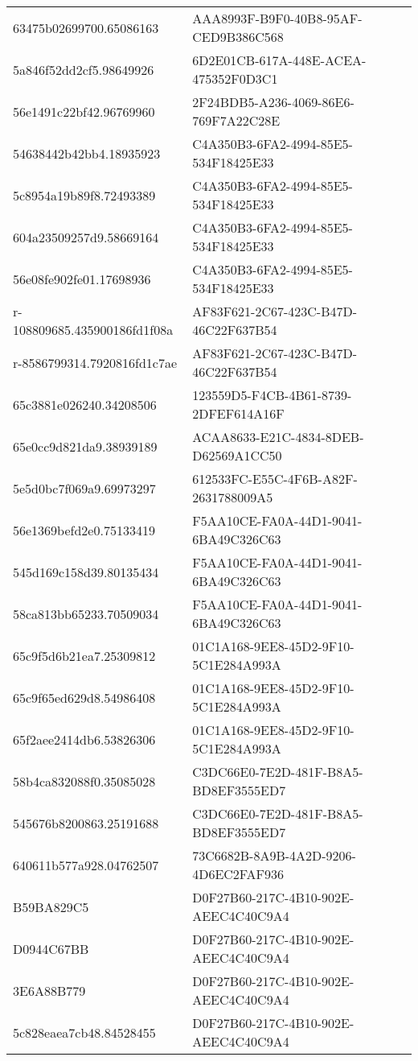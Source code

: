 \begin{tabular}{ll}
63475b02699700.65086163 & AAA8993F-B9F0-40B8-95AF-CED9B386C568 \\
5a846f52dd2cf5.98649926 & 6D2E01CB-617A-448E-ACEA-475352F0D3C1 \\
56e1491c22bf42.96769960 & 2F24BDB5-A236-4069-86E6-769F7A22C28E \\
54638442b42bb4.18935923 & C4A350B3-6FA2-4994-85E5-534F18425E33 \\
5c8954a19b89f8.72493389 & C4A350B3-6FA2-4994-85E5-534F18425E33 \\
604a23509257d9.58669164 & C4A350B3-6FA2-4994-85E5-534F18425E33 \\
56e08fe902fe01.17698936 & C4A350B3-6FA2-4994-85E5-534F18425E33 \\
r-108809685.435900186fd1f08a & AF83F621-2C67-423C-B47D-46C22F637B54 \\
r-8586799314.7920816fd1c7ae & AF83F621-2C67-423C-B47D-46C22F637B54 \\
65c3881e026240.34208506 & 123559D5-F4CB-4B61-8739-2DFEF614A16F \\
65e0cc9d821da9.38939189 & ACAA8633-E21C-4834-8DEB-D62569A1CC50 \\
5e5d0bc7f069a9.69973297 & 612533FC-E55C-4F6B-A82F-2631788009A5 \\
56e1369befd2e0.75133419 & F5AA10CE-FA0A-44D1-9041-6BA49C326C63 \\
545d169c158d39.80135434 & F5AA10CE-FA0A-44D1-9041-6BA49C326C63 \\
58ca813bb65233.70509034 & F5AA10CE-FA0A-44D1-9041-6BA49C326C63 \\
65c9f5d6b21ea7.25309812 & 01C1A168-9EE8-45D2-9F10-5C1E284A993A \\
65c9f65ed629d8.54986408 & 01C1A168-9EE8-45D2-9F10-5C1E284A993A \\
65f2aee2414db6.53826306 & 01C1A168-9EE8-45D2-9F10-5C1E284A993A \\
58b4ca832088f0.35085028 & C3DC66E0-7E2D-481F-B8A5-BD8EF3555ED7 \\
545676b8200863.25191688 & C3DC66E0-7E2D-481F-B8A5-BD8EF3555ED7 \\
640611b577a928.04762507 & 73C6682B-8A9B-4A2D-9206-4D6EC2FAF936 \\
B59BA829C5 & D0F27B60-217C-4B10-902E-AEEC4C40C9A4 \\
D0944C67BB & D0F27B60-217C-4B10-902E-AEEC4C40C9A4 \\
3E6A88B779 & D0F27B60-217C-4B10-902E-AEEC4C40C9A4 \\
5c828eaea7cb48.84528455 & D0F27B60-217C-4B10-902E-AEEC4C40C9A4 \\

\end{tabular}
